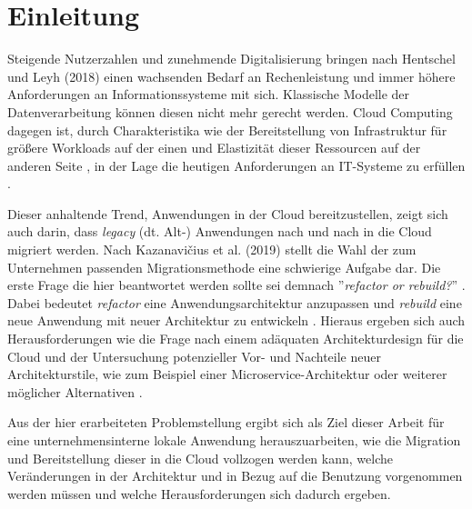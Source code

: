 \chapter{Einleitung}
Steigende Nutzerzahlen und zunehmende Digitalisierung bringen nach Hentschel und Leyh (2018) einen wachsenden Bedarf an Rechenleistung und immer höhere Anforderungen an Informationssysteme mit sich. Klassische Modelle der Datenverarbeitung können diesen nicht mehr gerecht werden. Cloud Computing dagegen ist, durch Charakteristika wie der Bereitstellung von Infrastruktur für größere Workloads auf der einen und Elastizität dieser Ressourcen auf der anderen Seite \cite[Vgl.][S. 2]{Mell2011}, in der Lage die heutigen Anforderungen an IT-Systeme zu erfüllen \cite[Vgl.][S. 6]{Reinheimer2018}.

Dieser anhaltende Trend, Anwendungen in der Cloud bereitzustellen, zeigt sich auch darin, dass \textit{legacy} (dt. Alt-) Anwendungen nach und nach in die Cloud migriert \mbox{werden}. Nach \mbox{Kazanavičius} et al. (2019) stellt die Wahl der zum Unternehmen passenden Migrationsmethode eine schwierige Aufgabe dar. Die erste Frage die hier beantwortet werden sollte sei demnach ''\textit{refactor or rebuild?}'' \cite[Vgl.][S. 4]{Kazanavicius2019}. Dabei bedeutet \textit{refactor} eine Anwendungsarchitektur anzupassen und \textit{rebuild} eine neue Anwendung mit neuer Architektur zu entwickeln \cite[Vgl.][S. 2]{Ahmad2018}. Hieraus ergeben sich auch Herausforderungen wie die Frage nach einem adäquaten Architekturdesign für die Cloud \cite[Vgl.][S. 14]{Pahl} und der Untersuchung potenzieller Vor- und Nachteile neuer Architekturstile, wie zum Beispiel einer Microservice-Architektur oder weiterer möglicher Alternativen \cite[Vgl.][S. 3]{Carrasco2018}.

Aus der hier erarbeiteten Problemstellung ergibt sich als Ziel dieser Arbeit für eine unternehmensinterne lokale Anwendung herauszuarbeiten, wie die Migration und Bereitstellung dieser in die Cloud vollzogen werden kann, welche Veränderungen in der Architektur und in Bezug auf die Benutzung vorgenommen werden müssen und welche Herausforderungen sich dadurch ergeben.

